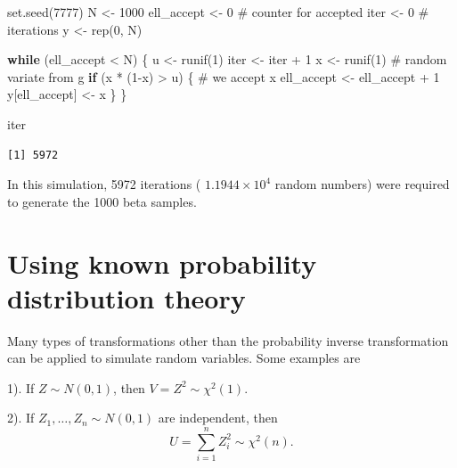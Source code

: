 \documentclass[
  letterpaper,
  DIV=11,
  numbers=noendperiod]{scrreprt}
\newenvironment{Shaded}{\begin{snugshade}}{\end{snugshade}}
\newcommand{\CommentTok}[1]{\textcolor[rgb]{0.37,0.37,0.37}{#1}}
\newcommand{\ControlFlowTok}[1]{\textcolor[rgb]{0.00,0.23,0.31}{\textbf{#1}}}
\newcommand{\DecValTok}[1]{\textcolor[rgb]{0.68,0.00,0.00}{#1}}
\newcommand{\FunctionTok}[1]{\textcolor[rgb]{0.28,0.35,0.67}{#1}}
\newcommand{\NormalTok}[1]{\textcolor[rgb]{0.00,0.23,0.31}{#1}}
\newcommand{\OtherTok}[1]{\textcolor[rgb]{0.00,0.23,0.31}{#1}}
\newcommand{\SpecialCharTok}[1]{\textcolor[rgb]{0.37,0.37,0.37}{#1}}
\begin{document}
\begin{Shaded}
\begin{Highlighting}[]
\FunctionTok{set.seed}\NormalTok{(}\DecValTok{7777}\NormalTok{)}
\NormalTok{N }\OtherTok{\textless{}{-}} \DecValTok{1000}
\NormalTok{ell\_accept }\OtherTok{\textless{}{-}} \DecValTok{0}       \CommentTok{\# counter for accepted}
\NormalTok{iter }\OtherTok{\textless{}{-}} \DecValTok{0}       \CommentTok{\# iterations}
\NormalTok{y }\OtherTok{\textless{}{-}} \FunctionTok{rep}\NormalTok{(}\DecValTok{0}\NormalTok{, N)}

\ControlFlowTok{while}\NormalTok{ (ell\_accept }\SpecialCharTok{\textless{}}\NormalTok{ N) \{}
\NormalTok{  u }\OtherTok{\textless{}{-}} \FunctionTok{runif}\NormalTok{(}\DecValTok{1}\NormalTok{)}
\NormalTok{  iter }\OtherTok{\textless{}{-}}\NormalTok{ iter }\SpecialCharTok{+} \DecValTok{1}
\NormalTok{  x }\OtherTok{\textless{}{-}} \FunctionTok{runif}\NormalTok{(}\DecValTok{1}\NormalTok{)   }\CommentTok{\# random variate from g}
  \ControlFlowTok{if}\NormalTok{ (x }\SpecialCharTok{*}\NormalTok{ (}\DecValTok{1}\SpecialCharTok{{-}}\NormalTok{x) }\SpecialCharTok{\textgreater{}}\NormalTok{ u) \{}
    \CommentTok{\# we accept x}
\NormalTok{    ell\_accept }\OtherTok{\textless{}{-}}\NormalTok{ ell\_accept }\SpecialCharTok{+} \DecValTok{1}
\NormalTok{    y[ell\_accept] }\OtherTok{\textless{}{-}}\NormalTok{ x}
\NormalTok{  \}}
\NormalTok{\}}

\NormalTok{iter}
\end{Highlighting}
\end{Shaded}

\begin{verbatim}
[1] 5972
\end{verbatim}

In this simulation, 5972 iterations ( \ensuremath{1.1944\times 10^{4}}
random numbers) were required to generate the 1000 beta samples.

\section{Using known probability distribution
theory}\label{using-known-probability-distribution-theory}

Many types of transformations other than the probability inverse
transformation can be applied to simulate random variables. Some
examples are

1). If \(Z \sim N(0,1)\), then \(V = Z^2 \sim \chi^2(1)\).

2). If \(Z_1,\ldots,Z_n \sim N(0,1)\) are independent, then \[
  U = \sum_{i=1}^n Z_i^2 \sim \chi^2(n).
  \]
\end{document}
